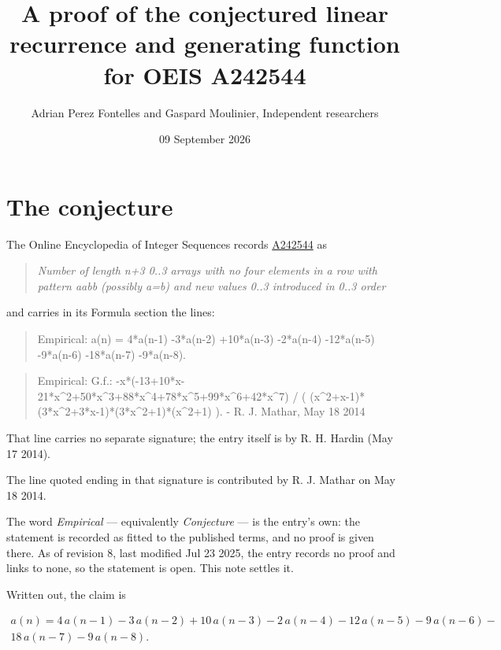 \documentclass[11pt]{article}
\title{A proof of the conjectured linear recurrence and generating function for OEIS A242544}
\author{Adrian Perez Fontelles and Gaspard Moulinier, Independent researchers}
\date{09 September 2026}
\theoremstyle{definition}
\begin{document}
\maketitle
\section{The conjecture}

The Online Encyclopedia of Integer Sequences records \href{https://oeis.org/A242544}{A242544} as

\begin{quote}\itshape Number of length n+3 0..3 arrays with no four elements in a row with pattern aabb (possibly a=b) and new values 0..3 introduced in 0..3 order\end{quote}

and carries in its Formula section the lines:

\begin{quote}\ttfamily Empirical: a(n) = 4*a(n-1) -3*a(n-2) +10*a(n-3) -2*a(n-4) -12*a(n-5) -9*a(n-6) -18*a(n-7) -9*a(n-8).\end{quote}

\begin{quote}\ttfamily Empirical: G.f.: -x*(-13+10*x-21*x\textasciicircum{}2+50*x\textasciicircum{}3+88*x\textasciicircum{}4+78*x\textasciicircum{}5+99*x\textasciicircum{}6+42*x\textasciicircum{}7) / ( (x\textasciicircum{}2+x-1)*(3*x\textasciicircum{}2+3*x-1)*(3*x\textasciicircum{}2+1)*(x\textasciicircum{}2+1) ). - R. J. Mathar, May 18 2014\end{quote}

That line carries no separate signature; the entry itself is by R. H. Hardin (May 17 2014).

The line quoted ending in that signature is contributed by R. J. Mathar on May 18 2014.

The word {\itshape Empirical} --- equivalently {\itshape Conjecture} --- is the entry's own: the statement is recorded as fitted to the published terms, and no proof is given there. As of revision 8, last modified Jul 23 2025, the entry records no proof and links to none, so the statement is open. This note settles it.

Written out, the claim is

\begin{multline*} a(n) = 4\,a(n-1) - 3\,a(n-2) + 10\,a(n-3) - 2\,a(n-4) - 12\,a(n-5) - 9\,a(n-6) - \\ 18\,a(n-7) - 9\,a(n-8). \end{multline*}
\end{document}
